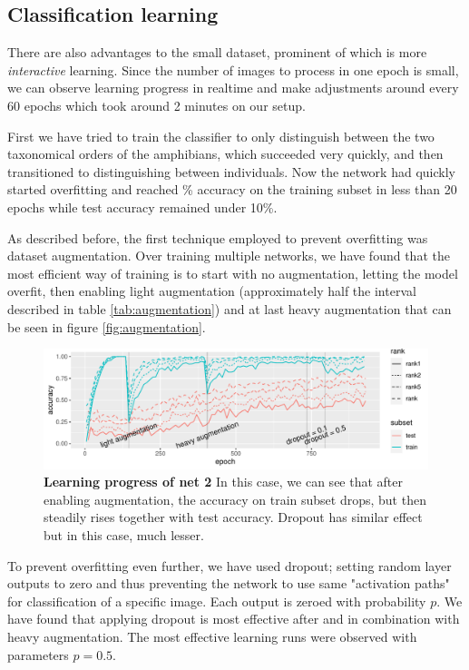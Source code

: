 \documentclass[fleqn,moreauthors,10pt]{ds_report}
\begin{document}
\subsection*{Classification learning}

There are also advantages to the small dataset, prominent of which is more \textit{interactive} learning. Since the number of images to process in one epoch is small, we can observe learning progress in realtime and make adjustments around every 60 epochs which took around 2 minutes on our setup.

First we have tried to train the classifier to only distinguish between the two taxonomical orders of the amphibians, which succeeded very quickly, and then transitioned to distinguishing between individuals. Now the network had quickly started overfitting and reached \% accuracy on the training subset in less than 20 epochs while test accuracy remained under 10\%. 

As described before, the first technique employed to prevent overfitting was dataset augmentation. Over training multiple networks, we have found that the most efficient way of training is to start with no augmentation, letting the model overfit, then enabling light augmentation (approximately half the interval described in table \ref{tab:augmentation}) and at last heavy augmentation that can be seen in figure \ref{fig:augmentation}.

\begin{figure}[ht]\centering
	\includegraphics[width=\linewidth]{learning-progress-ranks.pdf}
	\caption{\textbf{Learning progress of net 2} In this case, we can see that after enabling augmentation, the accuracy on train subset drops, but then steadily rises together with test accuracy. Dropout has similar effect but in this case, much lesser.}
	\label{fig:learning-progress}
\end{figure}

To prevent overfitting even further, we have used dropout; setting random layer outputs to zero and thus preventing the network to use same "activation paths" for classification of a specific image. Each output is zeroed with probability $p$. We have found that applying dropout is most effective after and in combination with heavy augmentation. The most effective learning runs were observed with parameters $p = 0.5$.
\end{document}

